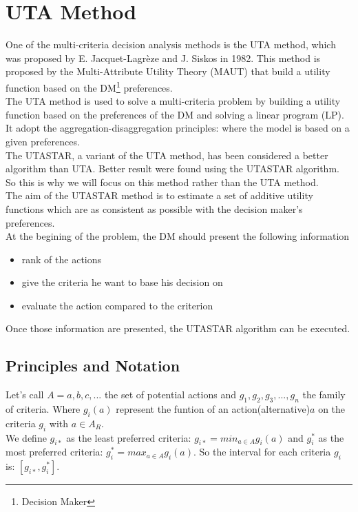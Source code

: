 \documentclass{report}
\begin{document}
\chapter{UTA Method}
One of the multi-criteria decision analysis methods is the UTA method, which was proposed by E. Jacquet-Lagrèze and J. Siskos in 1982. This method is proposed by the Multi-Attribute Utility Theory (MAUT) that build a utility function based on the DM\footnote{Decision Maker} preferences.\\
 
The UTA method is used to solve a multi-criteria problem by building a utility function based on the preferences of the DM and solving a linear program (LP). It adopt the aggregation-disaggregation principles: where the model is based on a given preferences.\\

The UTASTAR, a variant of the UTA method, has been considered a better algorithm than UTA. Better result were found using the UTASTAR algorithm. So this is why we will focus on this method rather than the UTA method.\\

The aim of the UTASTAR method is to estimate a set of additive utility functions which are as consistent as possible with the decision maker's preferences.\\

At the begining of the problem, the DM should present the following information 
\begin{itemize}
\item rank of the actions
\item give the criteria he want to base his decision on 
\item evaluate the action compared to the criterion
\end{itemize}
Once those information are presented, the UTASTAR algorithm can be executed. 

\newpage
\section{Principles and Notation}
Let's call $A={a,b,c,...}$ the set of potential actions and $g_1, g_2, g_3, ..., g_n$ the family of criteria. Where $g_i(a)$ represent the funtion of an action(alternative)$a$ on the criteria $g_i$ with $a \in A_R$. \\

We define $g_{i*}$ as the least preferred criteria: $g_{i*} = min_{a \in A} g_i (a)$ and $g_i^{*}$ as the most preferred criteria: $g_i^{*} = max_{a \in A} g_i (a)$. So the interval for each criteria $g_i$ is: $[g_{i*} , g_i^{*}]$.\\
\end{document}
